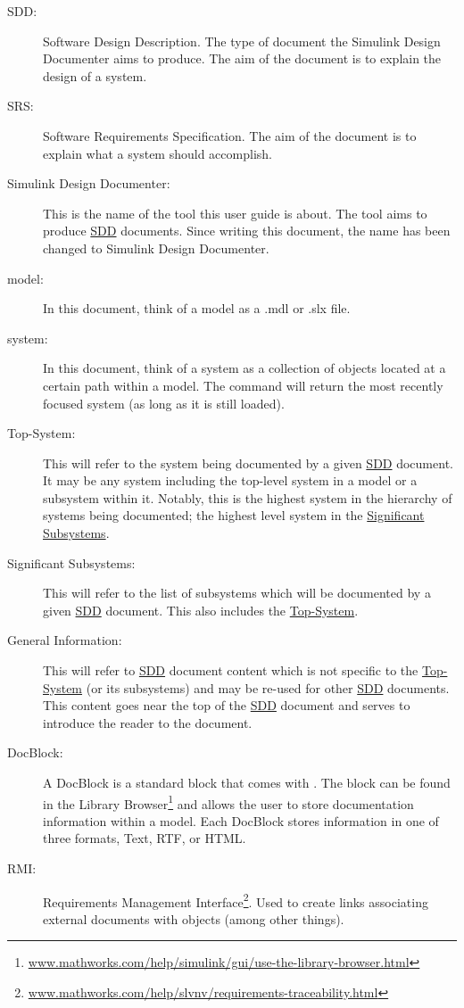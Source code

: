 \documentclass{mcscert}
\newcommand{\sddtool}{Simulink Design Documenter}
\newcommand{\topsystemnolink}{Top-System} %
\newcommand{\topsystem}{\hyperref[def:topsystem]{\topsystemnolink{}}}
\newcommand{\sigsubsnolink}{Significant Subsystems} %
\newcommand{\sigsubs}{\hyperref[def:sigsubs]{\sigsubsnolink{}}}
\newcommand{\geninfonolink}{General Information}
\begin{document}
\begin{description}
	\item[SDD:] \label{acr:sdd} Software Design Description. 
	The type of document the \sddtool{} aims to produce. 
	The aim of the document is to explain the design of a system.
	\item[SRS:] \label{acr:srs} Software Requirements Specification. 
	The aim of the document is to explain what a system should accomplish.
	\item[\sddtool{}\label{def:sddtool}:] This is the name of the tool this user guide is about. 
	The tool aims to produce \hyperref[acr:sdd]{SDD} documents. 
	Since writing this document, the name has been changed to Simulink Design Documenter.
	\item[\simulink{} model:] In this document, think of a \simulink{} model as a .mdl or .slx file.
	\item[\simulink{} system:] In this document, think of a \simulink{} system as a collection of \simulink{} objects located at a certain path within a \simulink{} model. 
	The  command will return the most recently focused \simulink{} system (as long as it is still loaded).
	\item[\topsystemnolink{}\label{def:topsystem}:] This will refer to the \simulink{} system being documented by a given \hyperref[acr:sdd]{SDD} document. 
	It may be any \simulink{} system including the top-level system in a model or a subsystem within it. 
	Notably, this is the highest system in the hierarchy of systems being documented; the highest level system in the \sigsubs{}.
	\item[\sigsubsnolink{}\label{def:sigsubs}:] This will refer to the list of \simulink{} subsystems which will be documented by a given \hyperref[acr:sdd]{SDD} document. 
	This also includes the \topsystem{}.
	\item[\geninfonolink{}\label{def:general-info}:] This will refer to \hyperref[acr:sdd]{SDD} document content which is not specific to the \topsystem{} (or its subsystems) and may be re-used for other \hyperref[acr:sdd]{SDD} documents. 
	This content goes near the top of the \hyperref[acr:sdd]{SDD} document and serves to introduce the reader to the document.
	\item[DocBlock\label{def:docblock}:] A \textsf{DocBlock} is a standard block that comes with \matlab{}. 
	The block can be found in the Library Browser\footnote{\label{library-browser}\href{https://www.mathworks.com/help/simulink/gui/use-the-library-browser.html}{www.mathworks.com/help/simulink/gui/use-the-library-browser.html}} and allows the user to store documentation information within a model. 
	Each \textsf{DocBlock} stores information in one of three formats, Text, RTF, or HTML.
	\item[RMI:] \label{acr:rmi} Requirements Management Interface\footnote{\href{https://www.mathworks.com/help/slvnv/requirements-traceability.html}{www.mathworks.com/help/slvnv/requirements-traceability.html}}. 
	Used to create links associating external documents with \simulink{} objects (among other things). %
\end{description}
 
\end{document}

